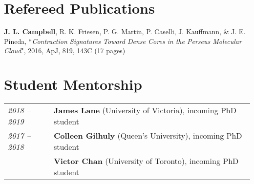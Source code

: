 \documentclass[10pt]{res} %
\begin{document}
\begin{resume}

\section{\Large Refereed Publications}
\vspace{-5pt} %
\noindent\makebox[\linewidth]{\rule{\textwidth}{0.4pt}}
\vspace{-20pt} %

\textbf{J. L. Campbell}, R. K. Friesen, P. G. Martin, P. Caselli, J. Kauffmann, \& J. E. Pineda, ``\textit{Contraction Signatures Toward Dense Cores in the Perseus Molecular Cloud}", 2016, ApJ, 819, 143C (17 pages)


\section{\Large Student Mentorship}
\vspace{-5pt} %
\noindent\makebox[\linewidth]{\rule{\textwidth}{0.4pt}}
\vspace{-20pt} %

\begin{table}[h!]
\begin{tabularx}{\textwidth}{lX}
\textit{2018 -- 2019} & \textbf{James Lane} (University of Victoria), incoming PhD student \\
\textit{2017 -- 2018} & \textbf{Colleen Gilhuly} (Queen's University), incoming PhD student \\
                                & \textbf{Victor Chan} (University of Toronto), incoming PhD student
\end{tabularx}
\end{table}




\end{resume}
\end{document}
